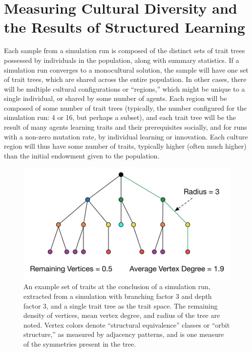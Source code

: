 \documentclass[graybox,natbib]{svmult}
\begin{document}
\section{Measuring Cultural Diversity and the Results of Structured
Learning}\label{measuring-cultural-diversity-and-the-results-of-structured-learning}

Each sample from a simulation run is composed of the distinct sets of
trait trees possessed by individuals in the population, along with
summary statistics. If a simulation run converges to a monocultural
solution, the sample will have one set of trait trees, which are shared
across the entire population. In other cases, there will be multiple
cultural configurations or ``regions,'' which might be unique to a
single individual, or shared by some number of agents. Each region will
be composed of some number of trait trees (typically, the number
configured for the simulation run: 4 or 16, but perhaps a subset), and
each trait tree will be the result of many agents learning traits and
their prerequisites socially, and for runs with a non-zero mutation
rate, by individual learning or innovation. Each culture region will
thus have some number of traits, typically higher (often much higher)
than the initial endowment given to the population.

\begin{figure}[htbp] 
\centering 
\includegraphics[]{equil-trait-tree.png} 
\caption{An example set of traits at the conclusion of a simulation run, extracted from a simulation with branching factor 3 and depth factor 3, and a single trait tree as the trait space.  The remaining density of vertices, mean vertex degree, and radius of the tree are noted.  Vertex colors denote ``structural equivalence'' classes or ``orbit structure,'' as measured by adjacency patterns, and is one measure of the symmetries present in the tree.} 
\label{img:final-tree} 
\end{figure}
\end{document}
